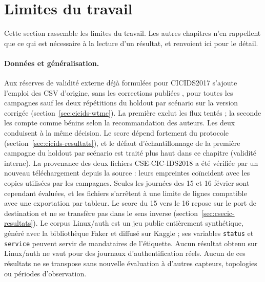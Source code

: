 \section{Limites du travail}
\label{sec:limites}

Cette section rassemble les limites du travail. Les autres chapitres n'en rappellent que ce
qui est nécessaire à la lecture d'un résultat, et renvoient ici pour le détail.

\paragraph{Données et généralisation.}
Aux réserves de validité externe déjà formulées pour CICIDS2017 s'ajoute l'emploi des CSV
d'origine, sans les corrections publiées \cite{engelen2021troubleshooting,lanvin2023errors},
pour toutes les campagnes sauf les deux répétitions du holdout par scénario sur la version corrigée
(section~\ref{sec:cicids-wtmc}). La première exclut les flux tentés ; la seconde les compte comme
bénins selon la recommandation des auteurs. Les deux conduisent à la même décision.
Le score dépend fortement du protocole (section~\ref{sec:cicids-resultats}), et le défaut
d'échantillonnage de la première campagne du holdout par scénario est traité plus haut dans ce chapitre (validité interne). La provenance des deux fichiers CSE-CIC-IDS2018 a été
vérifiée par un nouveau téléchargement depuis la source : leurs empreintes coïncident avec
les copies utilisées par les campagnes. Seules les journées des 15 et 16 février sont
cependant évaluées, et les fichiers s'arrêtent à une limite de lignes compatible avec une
exportation par tableur. Le score du 15 vers le 16 repose sur le port de destination et ne
se transfère pas dans le sens inverse (section~\ref{sec:csecic-resultats}). Le corpus
Linux/auth est un jeu public entièrement synthétique, généré avec la bibliothèque Faker et
diffusé sur Kaggle ; ses variables \texttt{status} et \texttt{service} peuvent servir de
mandataires de l'étiquette. Aucun résultat obtenu sur Linux/auth ne vaut pour des journaux
d'authentification réels. Aucun de ces résultats ne se transpose sans nouvelle évaluation à
d'autres capteurs, topologies ou périodes d'observation.

